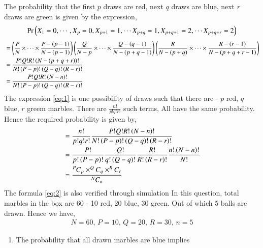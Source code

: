 \documentclass[journal,12pt,twocolumn]{IEEEtran}
\begin{document}
\begin{enumerate}
The probability that the first $p$ draws are red, next $q$ draws are blue, next $r$ draws are green is given by the expression,
\begin{align}
\Pr\left(X_1 = 0, \cdots, X_p = 0, X_{p+1} = 1, \cdots X_{p+q} = 1, X_{p+q+1} = 2, \cdots X_{p+q+r} = 2\right)
\end{align}
\begin{align}
&= \left(\frac{P}{N}\times \cdots \times \frac{P-\left(p-1\right)}{N-\left(p-1\right)}\right)\left(\frac{Q}{N-p}\times \cdots \times \frac{Q-\left(q-1\right)}{N-\left(p+q-1\right)}\right) \left(\frac{R}{N-\left(p+q\right)} \times \cdots \times \frac{R-\left(r-1\right)}{N-\left(p+q+r-1\right)}\right)\\
&= \frac{P! Q! R! \left(N-\left(p+q+r\right)\right)!}{N!\left(P-p\right)!\left(Q-q\right)!\left(R-r\right)!} \\
&= \frac{P! Q! R! \left(N-n\right)!}{N!\left(P-p\right)!\left(Q-q\right)!\left(R-r\right)!} \label{eq:1}
\end{align}
The expression \ref{eq:1} is one possibility of draws such that there are - $p$ red, $q$ blue, $r$ greem marbles. There are $\frac{n!}{p!q!r!}$ such terms, All have the same probability. Hence the required probability is given by, 
\begin{align}
&= \frac{n!}{p!q!r!} \frac{P! Q! R! \left(N-n\right)!}{N!\left(P-p\right)!\left(Q-q\right)!\left(R-r\right)!}\\
&= \frac{P!}{p!\left(P-p\right)!}\frac{Q!}{q!\left(Q-q\right)!}\frac{R!}{R!\left(R-r\right)!}\frac{n!\left(N-n\right)!}{N!}\\
&= \frac{^{P}C_{p} \times ^{Q}C_{q} \times ^{R}C_{r}}{^{N}C_{n}}
\label{eq:2}
\end{align}
The formula \eqref{eq:2} is also verified through simulation
\newpage
In this question, total marbles in the box are 60 - 10 red, 20 blue, 30 green. Out of which 5 balls are drawn. Hence we have,
\begin{align}
N = 60, \, P = 10, \,Q = 20,  \, R = 30, \,n = 5
\end{align}
\begin{enumerate}
\item The probability that all drawn marbles are blue implies
\begin{align}

\end{align}
\end{enumerate}
\end{enumerate}
\end{document}
